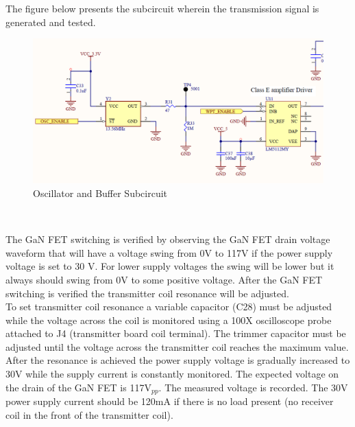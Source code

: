 \documentclass[12pt]{article}
\begin{document}
\noindent
The figure below presents the subcircuit wherein the transmission signal is generated and tested.
\hfill
\begin{figure}[h!]
\centering
\includegraphics[width=0.9\linewidth]{TX_oscillator_and_buffer}
\caption{Oscillator and Buffer Subcircuit}
\end{figure}
\hfill \\
\pagebreak

\indent
The GaN FET switching is verified by observing the GaN FET drain voltage waveform that will have a voltage swing from 0V to 117V if the power supply voltage is set to 30 V. For lower supply voltages the swing will be lower but it always should swing from 0V to some positive voltage.  After the GaN FET switching is verified the transmitter coil resonance will be adjusted. \\

\indent
To set transmitter coil resonance a variable capacitor (C28) must be adjusted while the voltage across the coil is monitored using a 100X oscilloscope probe attached to J4  (transmitter board coil terminal). The trimmer capacitor must be adjusted until the voltage across the transmitter coil reaches the maximum value. After the resonance is achieved the power supply voltage is gradually increased to 30V while the supply current is constantly monitored.  The expected voltage on the drain of the GaN FET is 117V$_{pp}$. The measured voltage is recorded.  The 30V power supply current should be 120mA if there is no load present (no receiver coil in the front of the transmitter coil).\\
\end{document}
